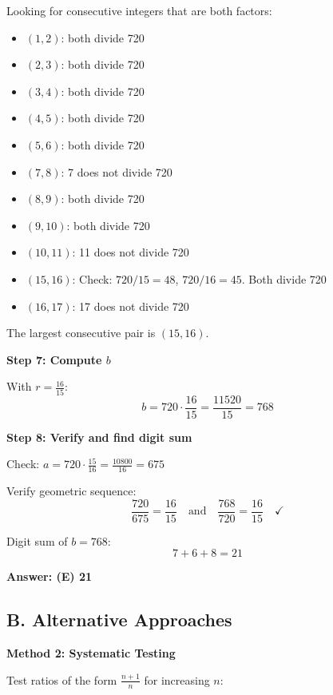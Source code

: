 \documentclass[11pt]{article}
\begin{document}
\begin{solutionbox}
Looking for consecutive integers that are both factors:
\begin{itemize}
    \item $(1, 2)$: both divide 720 \checkmark
    \item $(2, 3)$: both divide 720 \checkmark
    \item $(3, 4)$: both divide 720 \checkmark
    \item $(4, 5)$: both divide 720 \checkmark
    \item $(5, 6)$: both divide 720 \checkmark
    \item $(7, 8)$: 7 does not divide 720 \texttimes
    \item $(8, 9)$: both divide 720 \checkmark
    \item $(9, 10)$: both divide 720 \checkmark
    \item $(10, 11)$: 11 does not divide 720 \texttimes
    \item $(15, 16)$: Check: $720/15 = 48$, $720/16 = 45$. Both divide 720 \checkmark
    \item $(16, 17)$: 17 does not divide 720 \texttimes
\end{itemize}

The largest consecutive pair is $(15, 16)$.

\textbf{Step 7: Compute $b$}

With $r = \frac{16}{15}$:
\[
b = 720 \cdot \frac{16}{15} = \frac{11520}{15} = 768
\]

\textbf{Step 8: Verify and find digit sum}

Check: $a = 720 \cdot \frac{15}{16} = \frac{10800}{16} = 675$

Verify geometric sequence:
\[
\frac{720}{675} = \frac{16}{15} \quad \text{and} \quad \frac{768}{720} = \frac{16}{15} \quad \checkmark
\]

Digit sum of $b = 768$:
\[
7 + 6 + 8 = 21
\]

\textbf{Answer: (E) 21}

\subsection*{B. Alternative Approaches}

\textbf{Method 2: Systematic Testing}

Test ratios of the form $\frac{n+1}{n}$ for increasing $n$:


\end{solutionbox}
\end{document}
